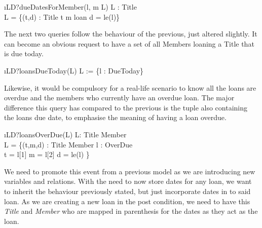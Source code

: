 \documentclass[12pt,a4paper]{article}
\begin{document}
\begin{showspecs}
	\begin{spec}{\i{LD?dueDatesForMember(l, m \to L)}}
		L : Title \nrightarrow {} \\
		L = \{(t,d) : Title \times {} \bullet t \mapsto m \in loan \wedge d = le(l)\}
	\end{spec}
\end{showspecs}


\medskip\noindent The next two queries follow the behaviour of the previous, just altered slightly. It can become an obvious request to have a set of all Members loaning a Title that is due today. 
		
\begin{showspecs}
	\begin{spec}{\i{LD?loansDueToday(\to L)}}
		L := \{l : DueToday\}
	\end{spec}
\end{showspecs}

\medskip\noindent Likewise, it would be compulsory for a real-life scenario to know all the loans are overdue and the members who currently have an overdue loan. The major difference this query has compared to the previous is the tuple also containing the loans due date, to emphasise the meaning of having a loan overdue.

\begin{showspecs}
	\begin{spec}{\i{LD?loansOverDue(\to L)}}
		L: Title \nrightarrow Member \times {}\\
		L = \{(t,m,d) : Title \times Member \times {} \bullet \forall l : OverDue \Rightarrow \\
			\hspace{1.5cm} t = l[1] \wedge m = l[2] \wedge d = le(l) \}
	\end{spec}
\end{showspecs}

\medskip\noindent We need to promote this event from a previous model as we are introducing new variables and relations. With the need to now store dates for any loan, we want to inherit the behaviour previously stated, but just incorporate dates in to said loan. As we are creating a new loan in the post condition, we need to have this \emph{Title} and \emph{Member} who are mapped in parenthesis for the dates as they act as the loan.
		
\end{document}
